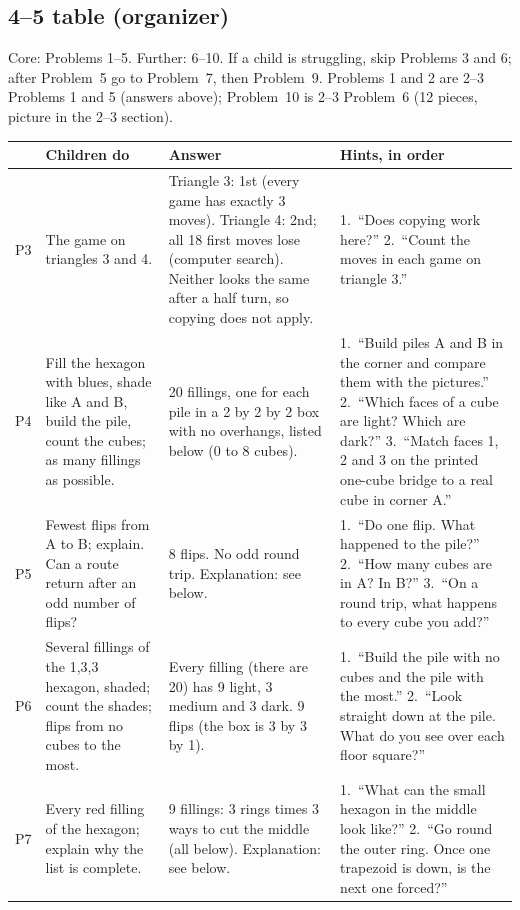 \documentclass[10pt]{article}
\newcommand{\core}{\newline{\footnotesize core}}
\newcommand{\more}{\newline{\footnotesize further}}
\begin{document}
\needspace{3in}
\subsection{4--5 table (organizer)}

Core: Problems 1--5. Further: 6--10. If a child is struggling, skip Problems 3 and 6; after Problem~5 go to Problem~7, then Problem~9. Problems 1 and 2 are 2--3 Problems 1 and 5 (answers above); Problem~10 is 2--3 Problem~6 (12 pieces, picture in the 2--3 section).

{\small
\begin{xltabular}{\linewidth}{L{0.42in} L{1.45in} Y Y}
\toprule
& \textbf{Children do} & \textbf{Answer} & \textbf{Hints, in order}\\
\midrule
P3\core & The game on triangles 3 and 4. &
Triangle 3: 1st (every game has exactly 3 moves). Triangle 4: 2nd; all 18 first moves lose (computer search). Neither looks the same after a half turn, so copying does not apply. &
1.~``Does copying work here?''
2.~``Count the moves in each game on triangle 3.''\\
P4\core & Fill the hexagon with blues, shade like A and B, build the pile, count the cubes; as many fillings as possible. &
20 fillings, one for each pile in a 2 by 2 by 2 box with no overhangs, listed below (0 to 8 cubes). &
1.~``Build piles A and B in the corner and compare them with the pictures.''
2.~``Which faces of a cube are light? Which are dark?''
3.~``Match faces 1, 2 and 3 on the printed one-cube bridge to a real cube in corner A.''\\
P5\core & Fewest flips from A to B; explain. Can a route return after an odd number of flips? &
8 flips. No odd round trip. Explanation: see below. &
1.~``Do one flip. What happened to the pile?''
2.~``How many cubes are in A? In B?''
3.~``On a round trip, what happens to every cube you add?''\\
P6\more & Several fillings of the 1,3,3 hexagon, shaded; count the shades; flips from no cubes to the most. &
Every filling (there are 20) has 9 light, 3 medium and 3 dark. 9 flips (the box is 3 by 3 by 1). &
1.~``Build the pile with no cubes and the pile with the most.''
2.~``Look straight down at the pile. What do you see over each floor square?''\\
P7\more & Every red filling of the hexagon; explain why the list is complete. &
9 fillings: 3 rings times 3 ways to cut the middle (all below). Explanation: see below. &
1.~``What can the small hexagon in the middle look like?''
2.~``Go round the outer ring. Once one trapezoid is down, is the next one forced?''

\end{xltabular}}
\end{document}
